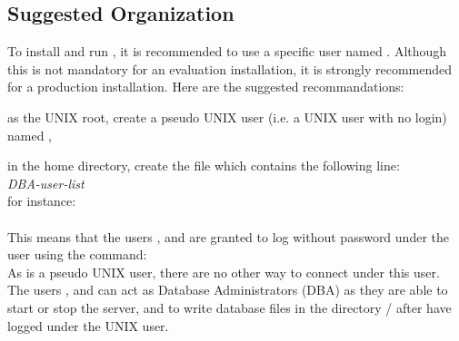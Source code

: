\subsection{Suggested Organization}
To install and run \eyedbX, it is recommended to use a specific
user named .
Although this is not mandatory for an evaluation installation,
it is strongly recommended for a production installation.
Here are the suggested recommandations:
\be
\item as the UNIX root, create a pseudo UNIX user (i.e. a UNIX
user with no login) named ,
\item in the  home directory, create the file 
which contains the following line:
\\
 \emph{DBA-user-list}
\\
for instance:
\\
\\
This means that the users ,  and  are
granted to log without password under the  user using the
command:
\\
As  is a pseudo UNIX user, there are no other way to connect
under this user.
The users ,  and  can act as Database
Administrators (DBA) as they are able to start or stop the \eyedb server,
and to write database files in the directory \tdir/
after have logged under the  UNIX user.
\ee


